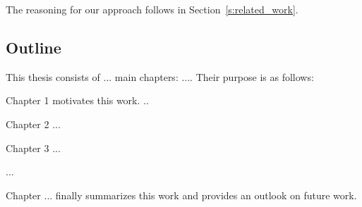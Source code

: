 

 The reasoning for our approach follows in Section~\ref{s:related_work}.



\subsection{Outline}

This thesis consists of ... main chapters: .... Their purpose is as follows:

Chapter 1 motivates this work.
..

Chapter 2 ...

Chapter 3 ...

...

Chapter ... finally summarizes this work and provides an outlook on future work.






